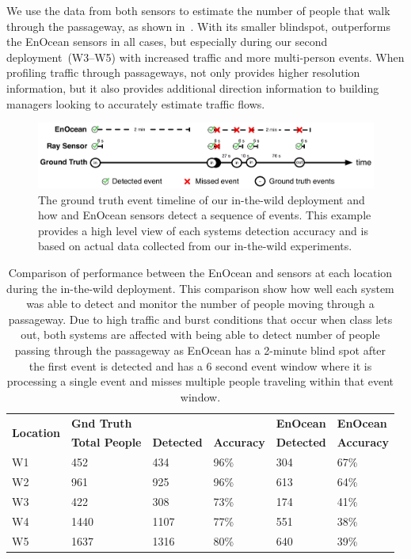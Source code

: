 We use the data from both sensors to estimate the number of people that walk through the passageway, as shown in~.
With its smaller blindspot, \sysname outperforms the EnOcean sensors in all cases, but especially during our second deployment~(W3--W5) with increased traffic and more multi-person events.
When profiling traffic through passageways, \sysname not only provides higher resolution information, but it also provides additional direction information to building managers looking to accurately estimate traffic flows.

\begin{figure}[t]
\centering
\includegraphics[width=\columnwidth]{figs/enocean_v_waldo_v_gt.pdf}
\caption{ The ground truth event timeline of our in-the-wild deployment and how \sysname and EnOcean sensors detect a sequence of events.  This example provides a high level view of each systems detection accuracy and is based on actual data collected from our in-the-wild experiments.  \label{fig:enoceanVwaldo}}
\end{figure}

\begin{table}[t]
\centering
\footnotesize
	\begin{tabular}{@{}p{1.0in}p{0.9in}p{0.8in}p{0.7in}p{0.7in}p{0.5in}@{}}
	\toprule
	\multirow{2}{*}{\textbf{Location}}	&	\textbf{Gnd Truth} & \textbf{\sysname} & \textbf{\sysname} & \textbf{EnOcean} 	& \textbf{EnOcean}	\\
	& \textbf{Total People} & \textbf{Detected} & \textbf{Accuracy} &  \textbf{Detected} & \textbf{Accuracy} \\\midrule
	W1 & 452 & 434 & 96\% & 304 & 67\% \\ %
	W2 & 961 & 925 & 96\% & 613 & 64\% \\ %
	W3 & 422 & 308 & 73\% & 174 & 41\% \\	%
        W4 & 1440 & 1107 & 77\% & 551 & 38\% \\ %
	W5 & 1637 & 1316 & 80\% & 640 & 39\% \\ %
	\bottomrule
	\end{tabular}
	\caption{Comparison of performance between the EnOcean and \sysname sensors at each location during the in-the-wild deployment.  This comparison show how well each system was able to detect and monitor the number of people moving through a passageway.  Due to high traffic and burst conditions that occur when class lets out, both systems are affected with being able to detect number of people passing through the passageway as EnOcean has a 2-minute blind spot after the first event is detected and \sysname has a 6 second event window where it is processing a single event and misses multiple people traveling within that event window.
	\vspace{1mm}
	\label{tab:ITWEnOceanVWaldoresults}}

\end{table}

